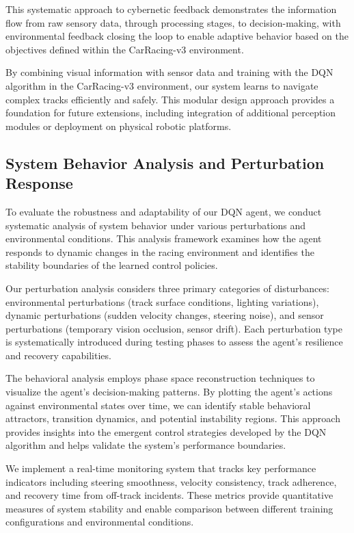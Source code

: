 This systematic approach to cybernetic feedback demonstrates the information flow from raw sensory data, through processing stages, to decision-making, with environmental feedback closing the loop to enable adaptive behavior based on the objectives defined within the CarRacing-v3 environment.

By combining visual information with sensor data and training with the DQN algorithm in the CarRacing-v3 environment, our system learns to navigate complex tracks efficiently and safely. This modular design approach provides a foundation for future extensions, including integration of additional perception modules or deployment on physical robotic platforms.

\subsection{System Behavior Analysis and Perturbation Response}

To evaluate the robustness and adaptability of our DQN agent, we conduct systematic analysis of system behavior under various perturbations and environmental conditions. This analysis framework examines how the agent responds to dynamic changes in the racing environment and identifies the stability boundaries of the learned control policies.

Our perturbation analysis considers three primary categories of disturbances: environmental perturbations (track surface conditions, lighting variations), dynamic perturbations (sudden velocity changes, steering noise), and sensor perturbations (temporary vision occlusion, sensor drift). Each perturbation type is systematically introduced during testing phases to assess the agent's resilience and recovery capabilities.

The behavioral analysis employs phase space reconstruction techniques to visualize the agent's decision-making patterns. By plotting the agent's actions against environmental states over time, we can identify stable behavioral attractors, transition dynamics, and potential instability regions. This approach provides insights into the emergent control strategies developed by the DQN algorithm and helps validate the system's performance boundaries.

We implement a real-time monitoring system that tracks key performance indicators including steering smoothness, velocity consistency, track adherence, and recovery time from off-track incidents. These metrics provide quantitative measures of system stability and enable comparison between different training configurations and environmental conditions.

